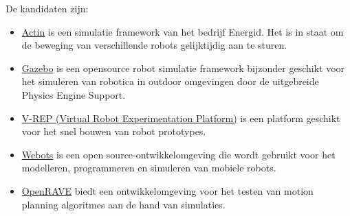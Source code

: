 \documentclass[a4paper, 11pt, oneside]{report}
\begin{document}
De kandidaten zijn:
\begin{itemize}
	\item \href{https://www.energid.com/actin}{Actin} is een simulatie framework van het bedrijf Energid. Het is in staat om de beweging van verschillende robots gelijktijdig aan te sturen.
	\item \href{http://gazebosim.org/}{Gazebo} is een opensource robot simulatie framework bijzonder geschikt voor het simuleren van robotica in outdoor omgevingen door de uitgebreide Physics Engine Support.
	\item \href{http://www.coppeliarobotics.com/}{V-REP (Virtual Robot Experimentation Platform)} is een platform geschikt voor het snel bouwen van robot prototypes.
	\item \href{https://cyberbotics.com/}{Webots} is een open source-ontwikkelomgeving die wordt gebruikt voor het modelleren, programmeren en simuleren van mobiele robots.
	\item \href{http://openrave.org/}{OpenRAVE} biedt een ontwikkelomgeving voor het testen van motion planning algoritmes aan de hand van simulaties.
\end{itemize}
\end{document}
